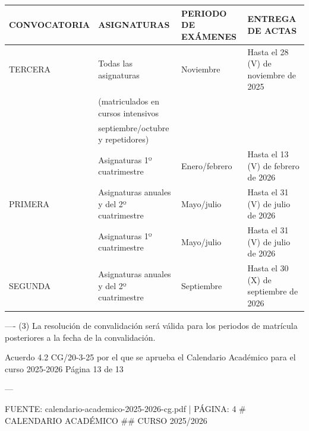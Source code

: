 \documentclass{article}
\begin{document}
\begin{itemize}
\begin{itemize}
\begin{scriptsize}
                  \vspace{0.4cm}
                  \begin{table}[h!]\centering\renewcommand{\arraystretch}{1.3}
                    \begin{tabular}{|p{}|p{}|p{}|p{}|}\hline
                      CONVOCATORIA & ASIGNATURAS                               & PERIODO DE EXÁMENES & ENTREGA DE ACTAS                      \\\hline
                      TERCERA      & Todas las asignaturas                     & Noviembre           & Hasta el 28 (V) de noviembre de 2025  \\\hline
                                   & (matriculados en cursos intensivos        &                     &                                       \\\hline
                                   & septiembre/octubre y repetidores)         &                     &                                       \\\hline
                                   & Asignaturas 1º cuatrimestre               & Enero/febrero       & Hasta el 13 (V) de febrero de 2026    \\\hline
                      PRIMERA      & Asignaturas anuales y del 2º cuatrimestre & Mayo/julio          & Hasta el 31 (V) de julio de 2026      \\\hline
                                   & Asignaturas 1º cuatrimestre               & Mayo/julio          & Hasta el 31 (V) de julio de 2026      \\\hline
                      SEGUNDA      & Asignaturas anuales y del 2º cuatrimestre & Septiembre          & Hasta el 30 (X) de septiembre de 2026 \\\hline
                    \end{tabular}\end{table}
                  \vspace{0.4cm}

                  ----
                  (3) La resolución de convalidación será válida para los periodos de matrícula posteriores a la fecha de la convalidación.

                  Acuerdo 4.2 CG/20-3-25 por el que se aprueba el Calendario Académico para el curso 2025-2026      Página 13 de 13

                  ---

                  FUENTE: calendario-academico-2025-2026-cg.pdf | PÁGINA: 4
                  \# CALENDARIO ACADÉMICO
                  \#\# CURSO 2025/2026


\end{scriptsize}
\end{itemize}
\end{itemize}
\end{document}
